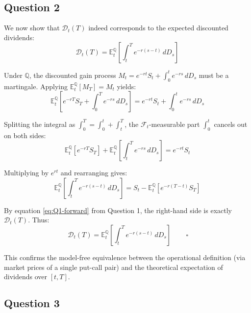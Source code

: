\documentclass[12pt,a4paper]{article}
\begin{document}
\subsection*{Question 2}

We now show that $\mathcal{D}_t(T)$ indeed corresponds to the expected discounted dividends:
\begin{equation*}
\mathcal{D}_t(T) = \mathbb{E}^{\mathbb{Q}}_{t}\!\left[\int_{t}^{T} e^{-r(s-t)}\,dD_s\right]
\end{equation*}

Under $\mathbb{Q}$, the discounted gain process $M_t = e^{-rt}S_t + \int_{0}^{t} e^{-rs}\,dD_s$ must be a martingale. Applying $\mathbb{E}^{\mathbb{Q}}_{t}[M_T] = M_t$ yields:
\begin{equation*}
\mathbb{E}^{\mathbb{Q}}_{t}\!\left[e^{-rT}S_T + \int_{0}^{T} e^{-rs}\,dD_s\right] = e^{-rt}S_t + \int_{0}^{t} e^{-rs}\,dD_s
\end{equation*}

Splitting the integral as $\int_{0}^{T} = \int_{0}^{t} + \int_{t}^{T}$, the $\mathcal{F}_t$-measurable part $\int_{0}^{t}$ cancels out on both sides:
\begin{equation*}
\mathbb{E}^{\mathbb{Q}}_{t}\!\left[e^{-rT}S_T\right] + \mathbb{E}^{\mathbb{Q}}_{t}\!\left[\int_{t}^{T} e^{-rs}\,dD_s\right] = e^{-rt}S_t
\end{equation*}

Multiplying by $e^{rt}$ and rearranging gives:
\begin{equation*}
\mathbb{E}^{\mathbb{Q}}_{t}\!\left[\int_{t}^{T} e^{-r(s-t)}\,dD_s\right] = S_t - \mathbb{E}^{\mathbb{Q}}_{t}\!\left[e^{-r(T-t)}S_T\right]
\end{equation*}

By equation \eqref{eq:Q1-forward} from Question 1, the right-hand side is exactly $\mathcal{D}_t(T)$. Thus:
\begin{equation*}
\boxed{\,\mathcal{D}_t(T) = \mathbb{E}^{\mathbb{Q}}_{t}\!\left[\int_{t}^{T} e^{-r(s-t)}\,dD_s\right]\,} \qquad \square
\end{equation*}

This confirms the model-free equivalence between the operational definition (via market prices of a single put-call pair) and the theoretical expectation of dividends over $[t,T]$.

\subsection*{Question 3}
\end{document}
